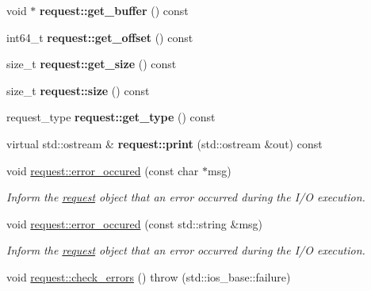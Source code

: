 \begin{CompactItemize}
\item 
\hypertarget{group__iolayer_gbc0add4ffc5e7c696ed4067cf630d935}{
void $\ast$ \textbf{request::get\_\-buffer} () const }
\label{group__iolayer_gbc0add4ffc5e7c696ed4067cf630d935}

\item 
\hypertarget{group__iolayer_gd8cb0dcaea77815e50f9d9f55b84db27}{
int64\_\-t \textbf{request::get\_\-offset} () const }
\label{group__iolayer_gd8cb0dcaea77815e50f9d9f55b84db27}

\item 
\hypertarget{group__iolayer_ge19716d99090239ece78660b0c7d567f}{
size\_\-t \textbf{request::get\_\-size} () const }
\label{group__iolayer_ge19716d99090239ece78660b0c7d567f}

\item 
\hypertarget{group__iolayer_g9bc852dd0ab2900911465f6a8e03ca6e}{
size\_\-t \textbf{request::size} () const }
\label{group__iolayer_g9bc852dd0ab2900911465f6a8e03ca6e}

\item 
\hypertarget{group__iolayer_gca7a3651bcfab4842a426399756b47e1}{
request\_\-type \textbf{request::get\_\-type} () const }
\label{group__iolayer_gca7a3651bcfab4842a426399756b47e1}

\item 
\hypertarget{group__iolayer_gbc1ade28e4e71c83eb166af89898350c}{
virtual std::ostream \& \textbf{request::print} (std::ostream \&out) const }
\label{group__iolayer_gbc1ade28e4e71c83eb166af89898350c}

\item 
\hypertarget{group__iolayer_gf946fd2411a5b613d195bc46c914facc}{
void \hyperlink{group__iolayer_gf946fd2411a5b613d195bc46c914facc}{request::error\_\-occured} (const char $\ast$msg)}
\label{group__iolayer_gf946fd2411a5b613d195bc46c914facc}

\begin{CompactList}\small\item\em Inform the \hyperlink{classrequest}{request} object that an error occurred during the I/O execution. \item\end{CompactList}\item 
\hypertarget{group__iolayer_g8bfe152a78eb167f7a07f573614c07b6}{
void \hyperlink{group__iolayer_g8bfe152a78eb167f7a07f573614c07b6}{request::error\_\-occured} (const std::string \&msg)}
\label{group__iolayer_g8bfe152a78eb167f7a07f573614c07b6}

\begin{CompactList}\small\item\em Inform the \hyperlink{classrequest}{request} object that an error occurred during the I/O execution. \item\end{CompactList}\item 
\hypertarget{group__iolayer_g32dc55876ffe5160f8c037b3c6eaf126}{
void \hyperlink{group__iolayer_g32dc55876ffe5160f8c037b3c6eaf126}{request::check\_\-errors} ()  throw (std::ios\_\-base::failure)}
\label{group__iolayer_g32dc55876ffe5160f8c037b3c6eaf126}


\end{CompactItemize}
